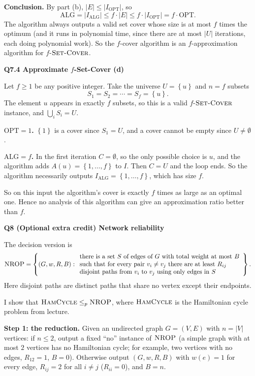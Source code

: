 \documentclass[11pt]{article}
\newcommand{\set}[1]{\left\{#1\right\}}
\newcommand{\abs}[1]{\left|#1\right|}
\newcommand{\lp}{\leq_p}
\newcommand{\cproblem}[1]{\textsc{#1}}
\newcommand{\HC}{\cproblem{HamCycle}}
\newcommand{\SC}{\cproblem{Set-Cover}}
\newcommand{\NROP}{\cproblem{NROP}}
\newcommand{\OPT}{\mathrm{OPT}}
\newcommand{\ALG}{\mathrm{ALG}}
\newcommand{\qpage}[1]{\clearpage\noindent\textbf{\large #1}\par\medskip}
\begin{document}
\textbf{Conclusion.}
By part (b), $\abs{E} \leq \abs{I_\OPT}$, so
\[
  \ALG = \abs{I_\ALG} \leq f \cdot \abs{E} \leq f \cdot \abs{I_\OPT} = f \cdot \OPT.
\]
The algorithm always outputs a valid set cover whose size is at most $f$ times the optimum (and it runs in polynomial time, since there are at most $\abs{U}$ iterations, each doing polynomial work).
So the $f$-cover algorithm is an $f$-approximation algorithm for $f$-$\SC$.

\qpage{Q7.4 Approximate $f$-Set-Cover (d)}

Let $f \geq 1$ be any positive integer.
Take the universe $U = \set{u}$ and $n = f$ subsets
\[
  S_1 = S_2 = \cdots = S_f = \set{u}.
\]
The element $u$ appears in exactly $f$ subsets, so this is a valid $f$-$\SC$ instance, and $\bigcup_i S_i = U$.

\textbf{$\OPT = 1$.}
$\set{1}$ is a cover since $S_1 = U$, and a cover cannot be empty since $U \neq \emptyset$.

\textbf{$\ALG = f$.}
In the first iteration $C = \emptyset$, so the only possible choice is $u$, and the algorithm adds $A(u) = \set{1, \ldots, f}$ to $I$.
Then $C = U$ and the loop ends.
So the algorithm necessarily outputs $I_\ALG = \set{1, \ldots, f}$, which has size $f$.

So on this input the algorithm's cover is exactly $f$ times as large as an optimal one.
Hence no analysis of this algorithm can give an approximation ratio better than $f$.

\qpage{Q8 (Optional extra credit) Network reliability}

The decision version is
\[
  \NROP = \set{(G, w, R, B) :
  \begin{array}{l}
    \text{there is a set } S \text{ of edges of } G \text{ with total weight at most } B\\
    \text{such that for every pair } v_i \neq v_j \text{ there are at least } R_{ij}\\
    \text{disjoint paths from } v_i \text{ to } v_j \text{ using only edges in } S
  \end{array}}.
\]
Here disjoint paths are distinct paths that share no vertex except their endpoints.

I show that $\HC \lp \NROP$, where $\HC$ is the Hamiltonian cycle problem from lecture.

\textbf{Step 1: the reduction.}
Given an undirected graph $G = (V, E)$ with $n = \abs{V}$ vertices:
if $n \leq 2$, output a fixed ``no'' instance of $\NROP$ (a simple graph with at most $2$ vertices has no Hamiltonian cycle; for example, two vertices with no edges, $R_{12} = 1$, $B = 0$).
Otherwise output $(G, w, R, B)$ with $w(e) = 1$ for every edge, $R_{ij} = 2$ for all $i \neq j$ ($R_{ii} = 0$), and $B = n$.
\end{document}
